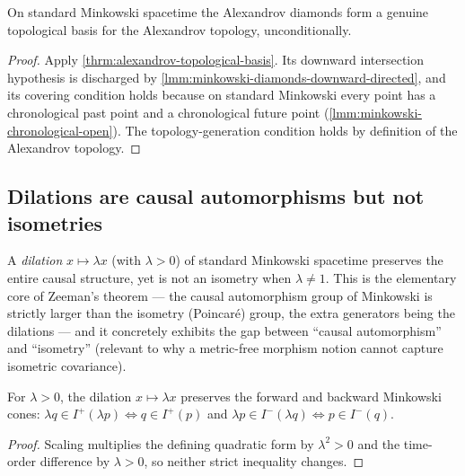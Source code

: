 \begin{theorem}
    \label{thrm:minkowski-alexandrov-basis}
    \leanok
    On standard Minkowski spacetime the Alexandrov diamonds form a genuine topological basis for the Alexandrov topology, unconditionally.
\end{theorem}
\begin{proof}
    \leanok
    Apply \ref{thrm:alexandrov-topological-basis}. Its downward intersection hypothesis is discharged by \ref{lmm:minkowski-diamonds-downward-directed}, and its covering condition holds because on standard Minkowski every point has a chronological past point and a chronological future point (\ref{lmm:minkowski-chronological-open}). The topology-generation condition holds by definition of the Alexandrov topology.
\end{proof}

\subsection{Dilations are causal automorphisms but not isometries}

A \emph{dilation} $x \mapsto \lambda x$ (with $\lambda > 0$) of standard Minkowski spacetime preserves the entire causal structure, yet is not an isometry when $\lambda \neq 1$. This is the elementary core of Zeeman's theorem --- the causal automorphism group of Minkowski is strictly larger than the isometry (Poincar\'e) group, the extra generators being the dilations --- and it concretely exhibits the gap between ``causal automorphism'' and ``isometry'' (relevant to why a metric-free morphism notion cannot capture isometric covariance).

\begin{lemma}
    \label{lmm:minkowski-dilation-cone}
    \leanok
    For $\lambda > 0$, the dilation $x \mapsto \lambda x$ preserves the forward and backward Minkowski cones: $\lambda q \in I^+(\lambda p) \iff q \in I^+(p)$ and $\lambda p \in I^-(\lambda q) \iff p \in I^-(q)$.
\end{lemma}
\begin{proof}
    \leanok
    Scaling multiplies the defining quadratic form by $\lambda^2 > 0$ and the time-order difference by $\lambda > 0$, so neither strict inequality changes.
\end{proof}

